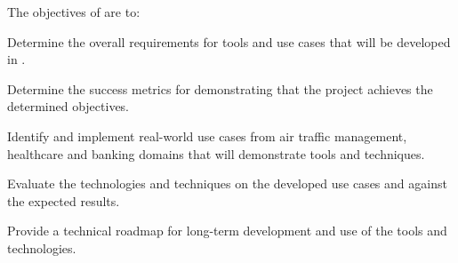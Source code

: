 \addtocounter{wpno}{1}
\begin{Workpackage}{\thewpno}
\WPTitle{\wpname{\thewpno}}



\begin{WPObjectives}
The objectives of \theWP{} are to:
\begin{compactitem}
\item	Determine the overall requirements for tools and use cases that will be developed in \TheProject{}.
\item Determine the success metrics for demonstrating that the \TheProject{} project achieves the determined objectives.
\item	Identify and implement real-world use cases from air traffic management, healthcare and banking domains that will demonstrate \TheProject{} tools and techniques.
\item	Evaluate the \TheProject{} technologies and techniques on the developed use cases and against the expected results.
\item	Provide a technical roadmap for long-term development and use of the \TheProject tools and technologies.
\end{compactitem}
\end{WPObjectives}


\end{Workpackage}
